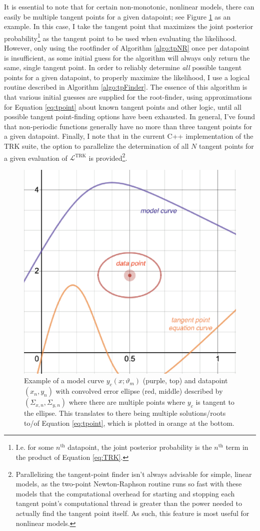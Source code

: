 It is essential to note that for certain non-monotonic, nonlinear models, there can easily be multiple tangent points for a given datapoint; see Figure \ref{fig:multtgt} as an example. In this case, I take the tangent point that maximizes the joint posterior probability\footnote{I.e. for some $n^\text{th}$ datapoint, the joint posterior probability is the $n^\text{th}$ term in the product of Equation \eqref{eq:TRK}.} as the tangent point to be used when evaluating the likelihood. However, only using the rootfinder of Algorithm \ref{algo:tpNR} once per datapoint is insufficient, as some initial guess for the algorithm will always only return the same, single tangent point. In order to reliably determine \textit{all} possible tangent points for a given datapoint, to properly maximize the likelihood, I use a logical routine described in Algorithm \ref{algo:tpFinder}. The essence of this algorithm is that various initial guesses are supplied for the root-finder, using approximations for Equation \eqref{eq:tpoint} about known tangent points and other logic, until all possible tangent point-finding options have been exhausted. In general, I've found that non-periodic functions generally have no more than three tangent points for a given datapoint. Finally, I note that in the current C++ implementation of the TRK suite, the option to parallelize the determination of all $N$ tangent points for a given evaluation of $\mathcal{L}^\text{TRK}$ is provided\footnote{Parallelizing the tangent-point finder isn't always advisable for simple, linear models, as the two-point Newton-Raphson routine runs so fast with these models that the computational overhead for starting and stopping each tangent point's computational thread is greater than the power needed to actually find the tangent point itself. As such, this feature is most useful for nonlinear models.}.
\begin{figure}
    \centering
    \includegraphics[width=0.6\linewidth]{figures/multtgtexample.eps}
    \caption{Example of a model curve $y_c(x;\vartheta_m)$ (purple, top) and datapoint $(x_n,y_n)$ with convolved error ellipse (red, middle) described by $(\Sigma_{x,n}, \Sigma_{y,n})$ where there are multiple points where $y_c$ is tangent to the ellipse. This translates to there being multiple solutions/roots to/of Equation \eqref{eq:tpoint}, which is plotted in orange at the bottom.}
    \label{fig:multtgt}
\end{figure}
